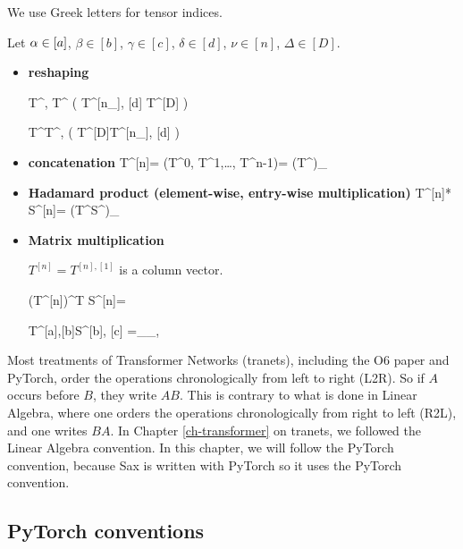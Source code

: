 We use
Greek letters for
tensor indices.

Let $\alpha\in[a]$, $\beta\in[b]$, $\gamma\in[c]$,
$\delta \in[d]$,
$\nu\in[n]$, $\Delta\in[D]$.


\begin{itemize}

\item{\bf reshaping}

\beq
T^{\nu, \delta}\rarrow T^{\Delta}
\;\;
\left(
T^{[n_\rvh], [d]} \rarrow T^{[D]}
\right)
\eeq

\beq
T^{\Delta}\rarrow T^{\nu, \delta}
\;\;
\left(
T^{[D]}\rarrow T^{[n_\rvh], [d]}
\right)
\eeq

\item {\bf concatenation}
\beq
T^{[n]}= (T^0, T^1,\ldots, T^{n-1})=
(T^\nu)_{\nu\in[n]}
\eeq

\item {\bf Hadamard product (element-wise, entry-wise multiplication)}
\beq
T^{[n]}* S^{[n]}= (T^\nu S^\nu)_{\nu\in[n]}
\eeq


\item {\bf Matrix multiplication}

$T^{[n]}= T^{[n], [1]}$ is a column vector.

\beq
(T^{[n]})^T S^{[n]}=
\eeq

\beq
T^{[a],[b]}S^{[b], [c]}
=
_{\alp_\in [a], \gamma \in [c]}
\eeq

\end{itemize}

Most treatments of Transformer Networks (tranets), including the
O6 paper and PyTorch,  order the
operations chronologically from
left to right (L2R). So if $A$ occurs before $B$,
they write $AB$.
This is contrary
to what is done in Linear Algebra, where one
orders the operations chronologically from right to left (R2L), and one writes $BA$.
In Chapter \ref{ch-transformer}
on tranets,
we followed the Linear Algebra
convention.
In this chapter,
we will
follow the PyTorch
convention,
because Sax is written with
PyTorch
so it uses the PyTorch convention.


\subsection{PyTorch conventions}



